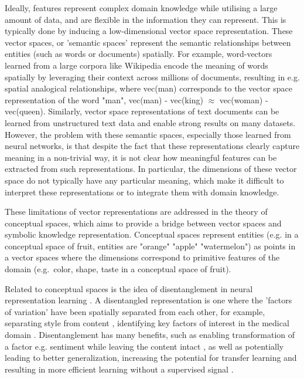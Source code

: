 
Ideally, features  represent complex domain knowledge while utilising a large amount of data, and are flexible in the information they can represent. This is typically done by inducing a low-dimensional vector space representation. These vector spaces, or 'semantic spaces' represent the semantic relationships between entities (such as words or documents)  spatially. For example, word-vectors \cite{Pennington2014} \cite{Mikolov2013} learned from a large corpora like Wikipedia encode the meaning of words spatially by leveraging their context across millions of documents, resulting in e.g. spatial analogical relationships, where vec(man) corresponds to the vector space representation of the word "man", vec(man) - vec(king) $\approx$ vec(woman) - vec(queen). Similarly, vector space representations of text documents can be learned from unstructured text data and enable strong results on many datasets. However, the problem with these semantic spaces, especially those learned from neural networks, is that despite the fact that these representations clearly capture meaning in a non-trivial way, it is not clear how meaningful features can be extracted from such representations. In particular, the dimensions of these vector space do not typically have any particular meaning, which make it difficult to interpret these representations or to integrate them with domain knowledge.




These limitations of vector representations are addressed in the theory of conceptual spaces, which aims to provide a bridge between vector spaces and symbolic knowledge representation. Conceptual spaces  represent entities (e.g. in a conceptual space of fruit, entities are "orange" "apple" "watermelon") as points in a vector spaces  where the dimensions  correspond to primitive features of the domain (e.g.\ color, shape, taste in a conceptual space of fruit). %




Related to conceptual spaces is the idea of disentanglement in neural representation learning \cite{Bengio2012}. A disentangled representation is one where the 'factors of variation' have been spatially separated from each other, for example, separating style from content  \cite{Chen2016}  \cite{John2019},  identifying key factors of interest in the medical domain \cite{Banner}. Disentanglement has many benefits, such as  enabling transformation of a factor e.g. sentiment  while leaving the content intact \cite{Larsson2017}, as well as potentially leading to better generalization, increasing the potential for transfer learning and resulting in more efficient learning without a supervised signal \cite{Banner}  \cite{Paige2016}. 

